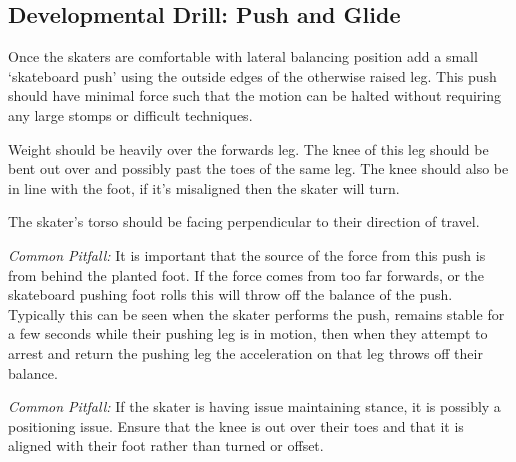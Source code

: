 \subsection*{Developmental Drill: Push and Glide}
\label{drill:laterals/developmental/push_and_glide}

Once the skaters are comfortable with lateral balancing position add a small `skateboard push' using the outside edges of the otherwise raised leg.
This push should have minimal force such that the motion can be halted without requiring any large stomps or difficult techniques.    

Weight should be heavily over the forwards leg. 
The knee of this leg should be bent out over and possibly past the toes of the same leg.
The knee should also be in line with the foot, if it's misaligned then the skater will turn.

The skater's torso should be facing perpendicular to their direction of travel.


{\it Common Pitfall:}
It is important that the source of the force from this push is from behind the planted foot.
If the force comes from too far forwards, or the skateboard pushing foot rolls this will throw off the balance of the push.
Typically this can be seen when the skater performs the push, remains stable for a few seconds while their pushing leg is in motion, then when they attempt to arrest and return the pushing leg the acceleration on that leg throws off their balance. 


{\it Common Pitfall:}
If the skater is having issue maintaining stance, it is possibly a positioning issue. Ensure that the knee is out over their toes and that it is aligned with their foot rather than turned or offset. 

